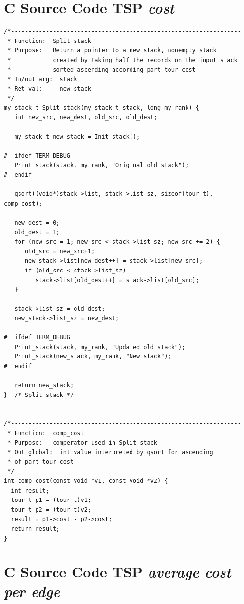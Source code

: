 \documentclass[a4paper,11pt,twoside]{article}
\begin{document}
\section{C Source Code TSP \textit{cost}}{\label{app:cost}}
\begin{verbatim}
/*------------------------------------------------------------------
 * Function:  Split_stack
 * Purpose:   Return a pointer to a new stack, nonempty stack
 *            created by taking half the records on the input stack
 *            sorted ascending according part tour cost
 * In/out arg:  stack
 * Ret val:     new stack
 */
my_stack_t Split_stack(my_stack_t stack, long my_rank) {
   int new_src, new_dest, old_src, old_dest;
   
   my_stack_t new_stack = Init_stack();
   
#  ifdef TERM_DEBUG
   Print_stack(stack, my_rank, "Original old stack");
#  endif

   qsort((void*)stack->list, stack->list_sz, sizeof(tour_t), comp_cost);

   new_dest = 0;
   old_dest = 1;
   for (new_src = 1; new_src < stack->list_sz; new_src += 2) {
      old_src = new_src+1;
      new_stack->list[new_dest++] = stack->list[new_src];
      if (old_src < stack->list_sz) 
         stack->list[old_dest++] = stack->list[old_src];
   }

   stack->list_sz = old_dest;
   new_stack->list_sz = new_dest;

#  ifdef TERM_DEBUG
   Print_stack(stack, my_rank, "Updated old stack");
   Print_stack(new_stack, my_rank, "New stack");
#  endif

   return new_stack;
}  /* Split_stack */


/*------------------------------------------------------------------           
 * Function:  comp_cost
 * Purpose:   comperator used in Split_stack
 * Out global:  int value interpreted by qsort for ascending 
 * of part tour cost 
 */
int comp_cost(const void *v1, const void *v2) {
  int result;
  tour_t p1 = (tour_t)v1;
  tour_t p2 = (tour_t)v2;
  result = p1->cost - p2->cost;
  return result;
}

\end{verbatim}

\section{C Source Code TSP \textit{average cost per edge}}{\label{app:avg_cost}}
\end{document}
